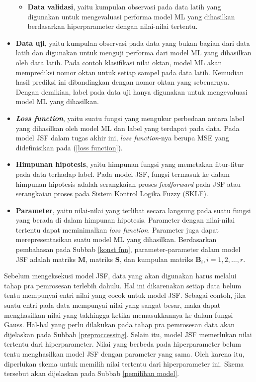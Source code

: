 \begin{itemize}
\begin{itemize}
        \item \textbf{Data validasi}, yaitu kumpulan observasi pada data latih yang digunakan untuk mengevaluasi performa model ML yang dihasilkan berdasarkan hiperparameter dengan nilai-nilai tertentu.
    \end{itemize}
    \item \textbf{Data uji}, yaitu kumpulan observasi pada data yang bukan bagian dari data latih dan digunakan untuk menguji performa dari model ML yang dihasilkan oleh data latih. Pada contoh klasifikasi nilai oktan, model ML akan memprediksi nomor oktan untuk setiap sampel pada data latih. Kemudian hasil prediksi ini dibandingkan dengan nomor oktan yang sebenarnya. Dengan demikian, label pada data uji hanya digunakan untuk mengevaluasi model ML yang dihasilkan.
    \item \textbf{\emph{Loss function}}, yaitu suatu fungsi yang mengukur perbedaan antara label yang dihasilkan oleh model ML dan label yang terdapat pada data. Pada model JSF dalam tugas akhir ini, \emph{loss function}-nya berupa MSE yang didefinisikan pada (\ref{loss function}).
    \item \textbf{Himpunan hipotesis}, yaitu himpunan fungsi yang memetakan fitur-fitur pada data terhadap label. Pada model JSF, fungsi termasuk ke dalam himpunan hipotesis adalah serangkaian proses \emph{feedforward} pada JSF atau serangkaian proses pada Sistem Kontrol Logika Fuzzy (SKLF).
    \item \textbf{Parameter}, yaitu nilai-nilai yang terlibat secara langsung pada suatu fungsi yang berada di dalam himpunan hipotesis. Parameter dengan nilai-nilai tertentu dapat meminimalkan \emph{loss function}. Parameter juga dapat merepresentasikan suatu model ML yang dihasilkan. Berdasarkan pembahasan pada Subbab \ref{konst fnn}, parameter-parameter dalam model JSF adalah matriks $\mathbf{M}$, matriks $\mathbf{S}$, dan kumpulan matriks $\mathbf{B}_i, i=1,2,\ldots,r$.
\end{itemize}

\noindent Sebelum mengeksekusi model JSF, data yang akan digunakan harus melalui tahap pra pemrosesan terlebih dahulu. Hal ini dikarenakan setiap data belum tentu mempunyai entri nilai yang cocok untuk model JSF. Sebagai contoh, jika suatu entri pada data mempunyai nilai yang sangat besar, maka dapat menghasilkan nilai yang takhingga ketika memasukkannya ke dalam fungsi Gauss. Hal-hal yang perlu dilakukan pada tahap pra pemrosesan data akan dijelaskan pada Subbab \ref{preproccessing}. Selain itu, model JSF memerlukan nilai tertentu dari hiperparameter. Nilai yang berbeda pada hiperparameter belum tentu menghasilkan model JSF dengan parameter yang sama. Oleh karena itu, diperlukan skema untuk memilih nilai tertentu dari hiperparameter ini. Skema tersebut akan dijelaskan pada Subbab \ref{pemilihan model}.

